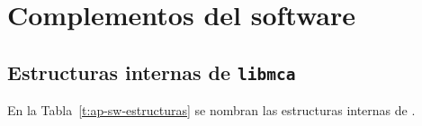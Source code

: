 \chapter{Complementos del software}
\label{C:ap-sw}

\graphicspath{{figs/apendices/}{figs/comunes/}}

\section{Estructuras internas de \texorpdfstring{\texttt{libmca}}{libmca}}
\label{S:ap-sw-estructuras}

En la Tabla~\ref{t:ap-sw-estructuras} se nombran las estructuras internas de
.

